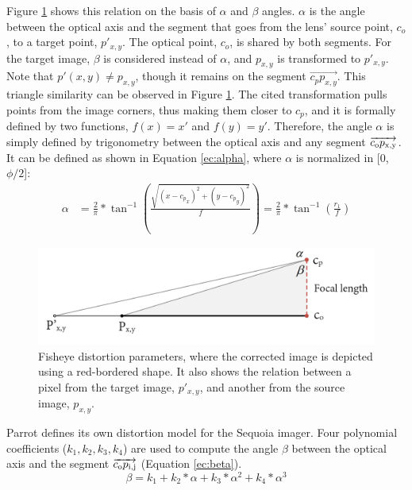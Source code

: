 Figure \ref{fig:fisheye_model} shows this relation on the basis of $\alpha$ and $\beta$ angles. $\alpha$ is the angle between the optical axis and the segment that goes from the lens' source point, $c_o$, to a target point, $p'_{x,y}$. The optical point, $c_o$, is shared by both segments. For the target image, $\beta$ is considered instead of $\alpha$, and $p_{x, y}$ is transformed to $p'_{x,y}$. Note that $p'(x, y) \neq p_{x, y}$, though it remains on the segment $\overrightarrow{c_p p_{x,y}}$. This triangle similarity can be observed in Figure \ref{fig:fisheye_model}. The cited transformation pulls points from the image corners, thus making them closer to $c_p$, and it is formally defined by two functions, $f(x) = x'$ and $f(y) = y'$. Therefore, the angle $\alpha$ is simply defined by trigonometry between the optical axis and any segment $\overrightarrow{c\textsubscript{o}p\textsubscript{x,y}}$. It can be defined as shown in Equation \ref{ec:alpha}, where $\alpha$ is normalized in [0, $\phi / 2$]:
\begin{equation}
\begin{split}
\label{ec:alpha}
\alpha & = \frac{2}{\pi} * \tan^{-1}(\frac{\sqrt{(x-{c_p}_x)^2 + (y-{c_p}_y)^2}}{f}) = \frac{2}{\pi} * \tan^{-1}(\frac{r_1}{f})
\end{split}
\end{equation}

\begin{figure}[h]
	\centering
	\includegraphics[width=\linewidth]{figs/materials/fisheye_model.png}
	\caption{Fisheye distortion parameters, where the corrected image is depicted using a red-bordered shape. It also shows the relation between a pixel from the target image, $p'_{x,y}$, and another from the source image, $p_{x,y}$.}
	\label{fig:fisheye_model}
\end{figure}

Parrot defines its own distortion model for the Sequoia imager. Four polynomial coefficients ($k_1, k_2, k_3, k_4$) are used to compute the angle $\beta$ between the optical axis and the segment $\overrightarrow{c\textsubscript{o}p\textsubscript{i,j}}$ (Equation \ref{ec:beta}).
\begin{equation}
\label{ec:beta}
\beta = k_1 + k_2 * \alpha + k_3 * \alpha ^ 2 + k_4 * \alpha ^ 3
\end{equation}

